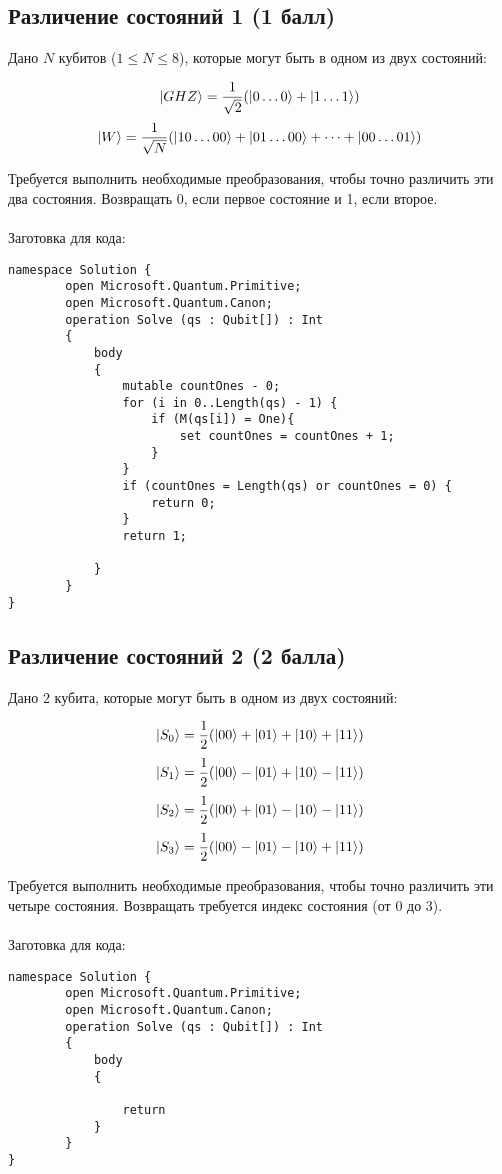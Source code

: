 \documentclass{article}
\begin{document}
\subsection{Различение состояний 1 (1 балл)}

Дано $N$ кубитов ($1 \le N \le 8$), которые могут быть в одном из двух состояний:

$$\Ket{GHZ} = \frac{1}{\sqrt2}(\Ket{0\dots0} +\Ket{1\dots1})$$
$$\Ket{W} = \frac{1}{\sqrt N}(\Ket{10\dots00}+\Ket{01\dots00} + \dots +\Ket{00\dots01})$$

Требуется выполнить необходимые преобразования, чтобы точно различить эти два состояния. Возвращать $0$, если первое состояние и 1, если второе. 
\\\\
Заготовка для кода:
\begin{lstlisting}
namespace Solution {
        open Microsoft.Quantum.Primitive;
        open Microsoft.Quantum.Canon;
        operation Solve (qs : Qubit[]) : Int
        {
            body
            {
                mutable countOnes - 0;
                for (i in 0..Length(qs) - 1) {
                    if (M(qs[i]) = One){
                        set countOnes = countOnes + 1;
                    }
                }
                if (countOnes = Length(qs) or countOnes = 0) {
                    return 0;
                }
                return 1;
 
            }
        }
}
\end{lstlisting}


\subsection{Различение состояний 2 (2 балла)}

Дано $2$ кубита, которые могут быть в одном из двух состояний:

$$\Ket{S_0} = \frac{1}{2}(\Ket{00} + \Ket{01} + \Ket{10} + \Ket{11})$$
$$\Ket{S_1} = \frac{1}{2}(\Ket{00} - \Ket{01} + \Ket{10} - \Ket{11})$$
$$\Ket{S_2} = \frac{1}{2}(\Ket{00} + \Ket{01} - \Ket{10} - \Ket{11})$$
$$\Ket{S_3} = \frac{1}{2}(\Ket{00} - \Ket{01} - \Ket{10} + \Ket{11})$$


Требуется выполнить необходимые преобразования, чтобы точно различить эти четыре состояния. Возвращать требуется индекс состояния (от $0$ до $3$). 
\\\\
Заготовка для кода:
\begin{lstlisting}
namespace Solution {
        open Microsoft.Quantum.Primitive;
        open Microsoft.Quantum.Canon;
        operation Solve (qs : Qubit[]) : Int
        {
            body
            {

                return 
            }
        }
}
\end{lstlisting}
\end{document}
